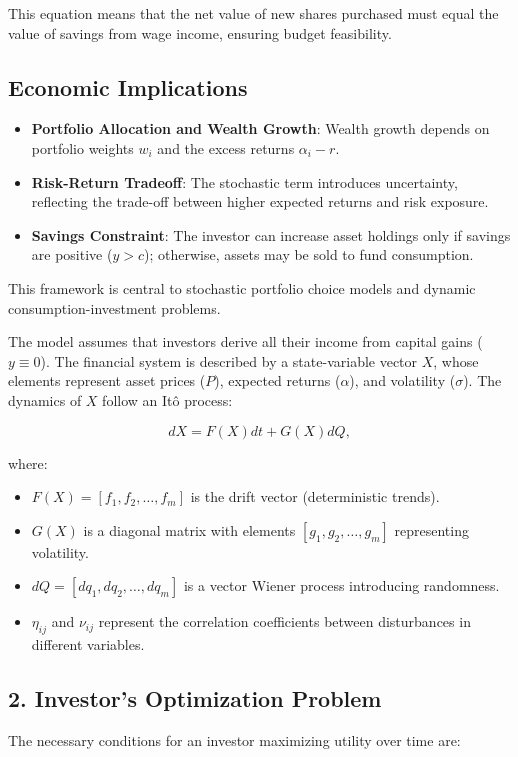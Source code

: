 \documentclass{article}
\begin{document}
This equation means that the net value of new shares purchased must equal the value of savings from wage income, ensuring budget feasibility.

\subsection*{Economic Implications}
\begin{itemize}
    \item \textbf{Portfolio Allocation and Wealth Growth}: Wealth growth depends on portfolio weights \( w_i \) and the excess returns \( \alpha_i - r \).
    \item \textbf{Risk-Return Tradeoff}: The stochastic term introduces uncertainty, reflecting the trade-off between higher expected returns and risk exposure.
    \item \textbf{Savings Constraint}: The investor can increase asset holdings only if savings are positive (\( y > c \)); otherwise, assets may be sold to fund consumption.
\end{itemize}

This framework is central to stochastic portfolio choice models and dynamic consumption-investment problems.

The model assumes that investors derive all their income from capital gains (\( y \equiv 0 \)). The financial system is described by a state-variable vector \( X \), whose elements represent asset prices (\( P \)), expected returns (\( \alpha \)), and volatility (\( \sigma \)). The dynamics of \( X \) follow an Itô process:

\[
dX = F(X) dt + G(X) dQ,
\]

where:
\begin{itemize}
    \item \( F(X) = [f_1, f_2, \dots, f_m] \) is the drift vector (deterministic trends).
    \item \( G(X) \) is a diagonal matrix with elements \( [g_1, g_2, \dots, g_m] \) representing volatility.
    \item \( dQ = [dq_1, dq_2, \dots, dq_m] \) is a vector Wiener process introducing randomness.
    \item \( \eta_{ij} \) and \( \nu_{ij} \) represent the correlation coefficients between disturbances in different variables.
\end{itemize}

\subsection*{2. Investor’s Optimization Problem}
The necessary conditions for an investor maximizing utility over time are:
\end{document}
